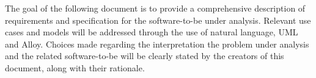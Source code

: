 \documentclass[../../main.tex]{subfiles}
\begin{document}
The goal of the following document is to provide a comprehensive description of requirements and specification for the software-to-be under analysis. Relevant use cases and models will be addressed through the use of natural language, UML and Alloy. Choices made regarding the interpretation the problem under analysis and the related software-to-be will be clearly stated by the creators of this document, along with their rationale.
\end{document}
